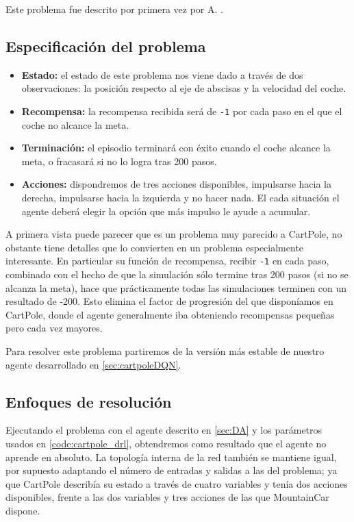 Este problema fue descrito por primera vez por A. \citet{Moore90efficientmemory-based}.

\subsection{Especificación del problema}

\begin{itemize}
    \item \textbf{Estado:} el estado de este problema nos viene dado a través de dos observaciones: la posición respecto al eje de abscisas y la velocidad del coche.
    \item \textbf{Recompensa:} la recompensa recibida será de \texttt{-1} por cada paso en el que el coche no alcance la meta.
    \item \textbf{Terminación:} el episodio terminará con éxito cuando el coche alcance la meta, o fracasará si no lo logra tras 200 pasos.
    \item \textbf{Acciones:} dispondremos de tres acciones disponibles, impulsarse hacia la derecha, impulsarse hacia la izquierda y no hacer nada. El cada situación el agente deberá elegir la opción que más impulso le ayude a acumular.
\end{itemize}

A primera vista puede parecer que es un problema muy parecido a CartPole, no obstante tiene detalles que lo convierten en un problema especialmente interesante. En particular su función de recompensa, recibir \texttt{-1} en cada paso, combinado con el hecho de que la simulación sólo termine tras 200 pasos (si no se alcanza la meta), hace que prácticamente todas las simulaciones terminen con un resultado de -200. Esto elimina el factor de progresión del que disponíamos en CartPole, donde el agente generalmente iba obteniendo recompensas pequeñas pero cada vez mayores.

Para resolver este problema partiremos de la versión más estable de nuestro agente desarrollado en \ref{sec:cartpoleDQN}.


\subsection{Enfoques de resolución}

Ejecutando el problema con el agente descrito en \ref{sec:DA} y los parámetros usados en \ref{code:cartpole_drl}, obtendremos como resultado que el agente no aprende en absoluto. La topología interna de la red también se mantiene igual, por supuesto adaptando el número de entradas y salidas a las del problema; ya que CartPole describía su estado a través de cuatro variables y tenía dos acciones disponibles, frente a las dos variables y tres acciones de las que MountainCar dispone.

